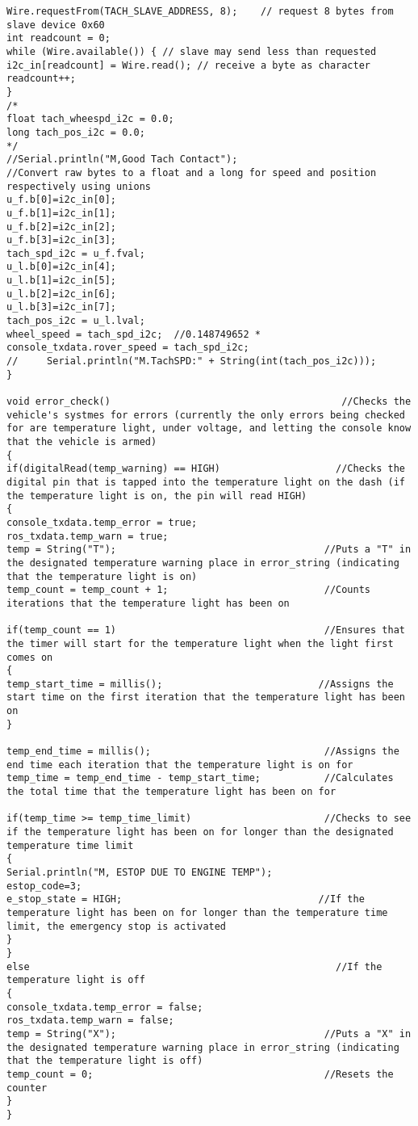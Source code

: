 \begin{lstlisting}[breaklines=true,basicstyle=\tiny]
Wire.requestFrom(TACH_SLAVE_ADDRESS, 8);    // request 8 bytes from slave device 0x60
int readcount = 0;
while (Wire.available()) { // slave may send less than requested
i2c_in[readcount] = Wire.read(); // receive a byte as character
readcount++;
}
/*
float tach_wheespd_i2c = 0.0;
long tach_pos_i2c = 0.0;
*/
//Serial.println("M,Good Tach Contact");
//Convert raw bytes to a float and a long for speed and position respectively using unions
u_f.b[0]=i2c_in[0];
u_f.b[1]=i2c_in[1];
u_f.b[2]=i2c_in[2];
u_f.b[3]=i2c_in[3];
tach_spd_i2c = u_f.fval;
u_l.b[0]=i2c_in[4];
u_l.b[1]=i2c_in[5];
u_l.b[2]=i2c_in[6];
u_l.b[3]=i2c_in[7];
tach_pos_i2c = u_l.lval;
wheel_speed = tach_spd_i2c;  //0.148749652 * 
console_txdata.rover_speed = tach_spd_i2c;
//     Serial.println("M.TachSPD:" + String(int(tach_pos_i2c)));
}

void error_check()                                        //Checks the vehicle's systmes for errors (currently the only errors being checked for are temperature light, under voltage, and letting the console know that the vehicle is armed)
{
if(digitalRead(temp_warning) == HIGH)                    //Checks the digital pin that is tapped into the temperature light on the dash (if the temperature light is on, the pin will read HIGH)                       
{
console_txdata.temp_error = true; 
ros_txdata.temp_warn = true;
temp = String("T");                                    //Puts a "T" in the designated temperature warning place in error_string (indicating that the temperature light is on)
temp_count = temp_count + 1;                           //Counts iterations that the temperature light has been on

if(temp_count == 1)                                    //Ensures that the timer will start for the temperature light when the light first comes on
{
temp_start_time = millis();                           //Assigns the start time on the first iteration that the temperature light has been on
}

temp_end_time = millis();                              //Assigns the end time each iteration that the temperature light is on for
temp_time = temp_end_time - temp_start_time;           //Calculates the total time that the temperature light has been on for

if(temp_time >= temp_time_limit)                       //Checks to see if the temperature light has been on for longer than the designated temperature time limit
{
Serial.println("M, ESTOP DUE TO ENGINE TEMP");
estop_code=3;
e_stop_state = HIGH;                                  //If the temperature light has been on for longer than the temperature time limit, the emergency stop is activated
}
}
else                                                     //If the temperature light is off
{
console_txdata.temp_error = false;
ros_txdata.temp_warn = false;
temp = String("X");                                    //Puts a "X" in the designated temperature warning place in error_string (indicating that the temperature light is off)
temp_count = 0;                                        //Resets the counter
}
}


\end{lstlisting}

